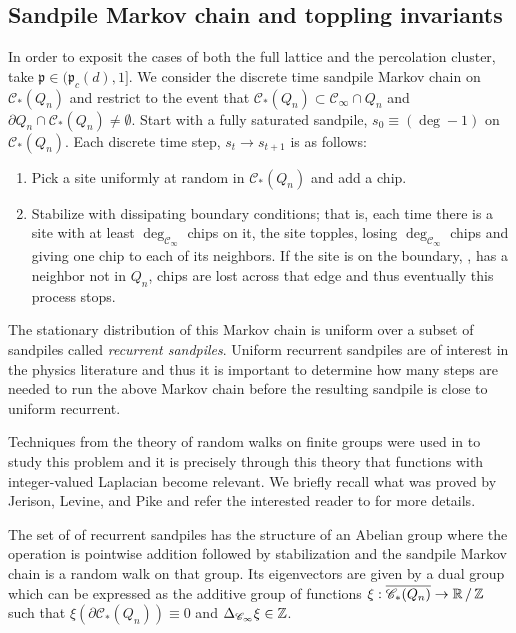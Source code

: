 \documentclass[12pt]{amsart}
\numberwithin{equation}{section}
\begin{document}
	\subsection{Sandpile Markov chain and toppling invariants} \label{subsec:sandpile-chain}
	In order to exposit the cases of both the full lattice and the percolation cluster, take  $\mathfrak{p} \in (\mathfrak{p}_c(d), 1]$.
	We consider the discrete time sandpile Markov chain on $\mathscr{C}_{*}(Q_n)$ and restrict to the event that $\mathscr{C}_{*}(Q_n) \subset \mathscr{C}_{\infty} \cap Q_n$ and $\partial Q_n \cap \mathscr{C}_{*}(Q_n) \neq \emptyset$.  
	Start with a fully saturated sandpile, $s_0 \equiv (\deg -1 )$ on  $\mathscr{C}_{*}(Q_n)$.  Each discrete time step, $s_t \to s_{t+1}$ is as follows: 
	\begin{enumerate}
		\item Pick a site uniformly at random in $\mathscr{C}_{*}(Q_n)$  and add a chip.
		\item Stabilize with dissipating boundary conditions; that is, each time there is a site with at least $\deg_{\mathscr{C}_{\infty}}$ chips on it, the site topples, 
		losing $\deg_{\mathscr{C}_{\infty}}$ chips and giving one chip to each of its neighbors. If the site is on the boundary, \ie, has a neighbor not in $Q_n$, chips are lost across that edge and thus eventually this process stops.
	\end{enumerate}
	The stationary distribution of this Markov chain is uniform over a subset of sandpiles called {\it recurrent sandpiles}.
	Uniform recurrent sandpiles are of interest in the physics literature \cite{dhar-algebraic-aspects}
	and thus it is important to determine how many steps are needed to run the above Markov chain before the resulting sandpile is close to uniform recurrent. 
	
	Techniques from the theory of random walks on finite groups were used in \cite{jerison-levine-pike-2019} to 
	study this problem and it is precisely through this theory that functions with integer-valued Laplacian become relevant. We briefly recall
	what was proved by Jerison, Levine, and Pike and refer the interested reader to \cite{jerison-levine-pike-2019} for more details. 
	
	The set of of recurrent sandpiles has the structure of an Abelian group where the operation is pointwise addition followed by stabilization and the sandpile Markov chain is a random walk on that group. Its eigenvectors are given by a dual group which can be expressed as the additive group of functions
	$\xi: \overline{\mathscr{C}_{*}(Q_n)} \to \operatorname{\mathbb{R}} / \operatorname{\mathbb{Z}}$ such that $\xi(\partial \mathscr{C}_{*}(Q_n)) \equiv 0$ and $\Delta_{\mathscr{C}_{\infty}} \xi \in \operatorname{\mathbb{Z}}$. 
	
\end{document}
